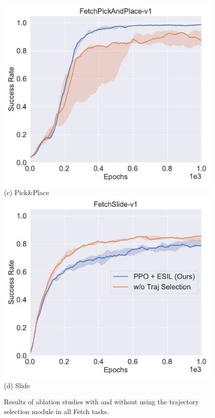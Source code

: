 \begin{figure}[h!]
  \includegraphics[width=\linewidth]{figures/chapter3/pick_hs.pdf}
  ({c}) Pick$\&$Place
\endminipage
{}%
  \centering
  \includegraphics[width=\linewidth]{figures/chapter3/slide_hs.pdf}
  ({d}) Slide
\endminipage\hfill
\caption{Results of ablation studies with and without using the trajectory selection module in all Fetch tasks. }
\label{fig:hs_compare}
\end{figure}

